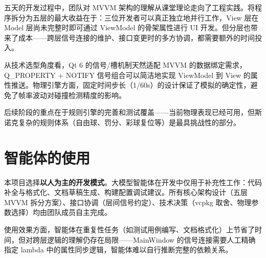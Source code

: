 \documentclass[11pt]{ctexart}
\begin{document}
五天的开发过程中，团队对 MVVM 架构的理解从课堂理论走向了工程实践。将程序拆分为五层的最大收益在于：三位开发者可以真正独立地并行工作，View 层在 Model 层尚未完整时即可通过 ViewModel 的骨架属性进行 UI 开发。但分层也带来了成本——跨层信号连接的维护、接口变更时的多方协调，都需要额外的时间投入。

从技术选型角度看，Qt 6 的信号/槽机制天然适配 MVVM 的数据绑定需求，Q\_PROPERTY + NOTIFY 信号组合可以简洁地实现 ViewModel 到 View 的属性推送。物理引擎方面，固定时间步长（1/60s）的设计保证了模拟的确定性，避免了帧率波动对碰撞检测精度的影响。

后续阶段的重点在于规则引擎的完善和测试覆盖——当前物理表现已经可用，但斯诺克复杂的规则体系（自由球、罚分、彩球复位等）是最具挑战性的部分。

\section{智能体的使用}

本项目选择\textbf{以人为主的开发模式}。大模型智能体在开发中仅用于补充性工作：代码补全与格式化、文档草稿生成、构建配置调试建议。所有核心架构设计（五层 MVVM 拆分方案）、接口协调（层间信号约定）、技术决策（vcpkg 取舍、物理参数选择）均由团队成员自主完成。

使用效果方面，智能体在重复性任务（如测试用例编写、文档格式化）上节省了时间，但对跨层逻辑的理解仍存在局限——MainWindow 的信号连接需要人工精确指定 lambda 中的属性同步逻辑，智能体难以自行推断完整的依赖关系。
\end{document}
